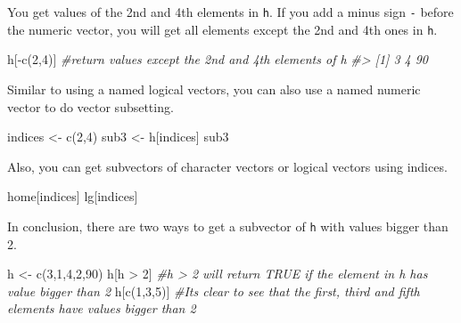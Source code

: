 \documentclass[
]{book}
\newenvironment{Shaded}{\begin{snugshade}}{\end{snugshade}}
\newcommand{\CommentTok}[1]{\textcolor[rgb]{0.56,0.35,0.01}{\textit{#1}}}
\newcommand{\DecValTok}[1]{\textcolor[rgb]{0.00,0.00,0.81}{#1}}
\newcommand{\FunctionTok}[1]{\textcolor[rgb]{0.00,0.00,0.00}{#1}}
\newcommand{\NormalTok}[1]{#1}
\newcommand{\OtherTok}[1]{\textcolor[rgb]{0.56,0.35,0.01}{#1}}
\newcommand{\SpecialCharTok}[1]{\textcolor[rgb]{0.00,0.00,0.00}{#1}}
\newenvironment{blackbox}{
  \definecolor{shadecolor}{rgb}{0, 0, 0}  %
  \color{white}
  \begin{shaded}}
 {\end{shaded}}
\newenvironment{infobox}[1]
  {
  \begin{itemize}
  \renewcommand{\labelitemi}{
    \raisebox{-.7\height}[0pt][0pt]{
      {\setkeys{Gin}{width=3em,keepaspectratio}
        \texttt{[image: pics/\#1]}}
    }
  }
  \setlength{\fboxsep}{1em}
  \begin{blackbox}
  \item
  }
  {
  \end{blackbox}
  \end{itemize}
  }
\begin{document}
You get values of the 2nd and 4th elements in \texttt{h}. If you add a minus sign \texttt{-} before the numeric vector, you will get all elements except the 2nd and 4th ones in \texttt{h}.

\begin{Shaded}
\begin{Highlighting}[]
\NormalTok{h[}\SpecialCharTok{{-}}\FunctionTok{c}\NormalTok{(}\DecValTok{2}\NormalTok{,}\DecValTok{4}\NormalTok{)]  }\CommentTok{\#return values except the 2nd and 4th elements of h}
\CommentTok{\#\textgreater{} [1]  3  4 90}
\end{Highlighting}
\end{Shaded}

Similar to using a named logical vectors, you can also use a named numeric vector to do vector subsetting.

\begin{Shaded}
\begin{Highlighting}[]
\NormalTok{indices }\OtherTok{\textless{}{-}} \FunctionTok{c}\NormalTok{(}\DecValTok{2}\NormalTok{,}\DecValTok{4}\NormalTok{)}
\NormalTok{sub3 }\OtherTok{\textless{}{-}}\NormalTok{ h[indices]}
\NormalTok{sub3}
\end{Highlighting}
\end{Shaded}

Also, you can get subvectors of character vectors or logical vectors using indices.

\begin{Shaded}
\begin{Highlighting}[]
\NormalTok{home[indices]}
\NormalTok{lg[indices]}
\end{Highlighting}
\end{Shaded}

\begin{infobox}{caution}

In conclusion, there are two ways to get a subvector of \texttt{h} with values bigger than 2.

\begin{Shaded}
\begin{Highlighting}[]
\NormalTok{h }\OtherTok{\textless{}{-}} \FunctionTok{c}\NormalTok{(}\DecValTok{3}\NormalTok{,}\DecValTok{1}\NormalTok{,}\DecValTok{4}\NormalTok{,}\DecValTok{2}\NormalTok{,}\DecValTok{90}\NormalTok{)}
\NormalTok{h[h }\SpecialCharTok{\textgreater{}} \DecValTok{2}\NormalTok{]      }\CommentTok{\#h \textgreater{} 2 will return TRUE if the element in h has value bigger than 2}
\NormalTok{h[}\FunctionTok{c}\NormalTok{(}\DecValTok{1}\NormalTok{,}\DecValTok{3}\NormalTok{,}\DecValTok{5}\NormalTok{)]   }\CommentTok{\#It\textquotesingle{}s clear to see that the first, third and fifth elements have values bigger than 2}
\end{Highlighting}
\end{Shaded}

\end{infobox}
\end{document}

